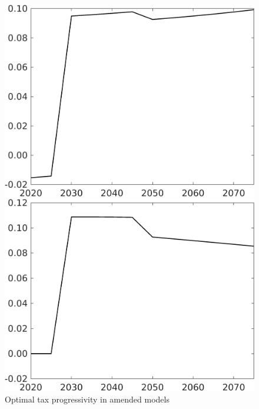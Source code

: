\begin{figure}[h!!]
	\centering
	\caption{Optimal tax progressivity in amended models }\label{fig:optPol_nogr_nosk}
	\begin{minipage}[]{0.32\textwidth}
		\includegraphics[width=1\textwidth]{../../codding_model/own_basedOnFried/optimalPol_190722_tidiedUp/figures/all_July22/taul_SingleAltPolOPT_T_NoTaus_regime3_spillover0_noskill0_sep1_xgrowth0_etaa0.79.png}
	\end{minipage}
	\begin{minipage}[]{0.32\textwidth}
	\includegraphics[width=1\textwidth]{../../codding_model/own_basedOnFried/optimalPol_190722_tidiedUp/figures/all_July22/taul_SingleAltPolOPT_T_NoTaus_regime3_spillover0_noskill0_sep1_xgrowth1_etaa0.79.png}

\end{minipage}
\end{figure}
